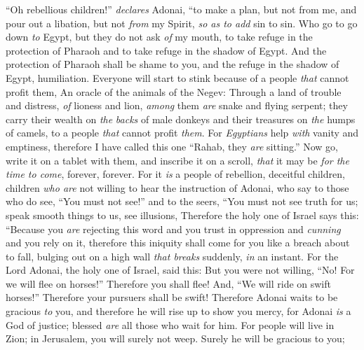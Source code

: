 \begin{biblechapter} %
 “Oh rebellious children!” \textit{declares} Adonai,
\verse “to make a plan, but not from me, 
and pour out a libation, but not \textit{from} my Spirit, 
\textit{so as to add} sin to sin.
\verse Who go to go down \textit{to} Egypt, 
but they do not ask \textit{of} my mouth, 
to take refuge in the protection of Pharaoh 
and to take refuge in the shadow of Egypt.
\verse And the protection of Pharaoh shall be shame to you, 
and the refuge in the shadow of Egypt, humiliation.
\verse Everyone will start to stink because of a people \textit{that} cannot profit them,
 An oracle of the animals of the Negev:
\verse Through a land of trouble and distress, 
\textit{of} lioness and lion, 
\textit{among} them \textit{are} snake and flying serpent; 
they carry their wealth on \textit{the} \textit{backs} of male donkeys 
and their treasures on \textit{the} humps of camels, 
to a people \textit{that} cannot profit \textit{them}.
\verse For \textit{Egyptians} help \textit{with} vanity and emptiness, 
therefore I have called this one “Rahab, they \textit{are} sitting.”
\verse Now go, write it on a tablet with them, 
and inscribe it on a scroll, 
\textit{that} it may be \textit{for the time to come}, 
forever, forever.
\verse For it \textit{is} a people of rebellion, deceitful children, 
children \textit{who are} not willing to hear the instruction of Adonai,
\verse who say to those who do see, “You must not see!” 
and to the seers, “You must not see truth for us; 
speak smooth things to us, 
see illusions,
\verse Therefore the holy one of Israel says this:
\verse “Because you \textit{are} rejecting this word 
and you trust in oppression and \textit{cunning} 
and you rely on it,
\verse therefore this iniquity shall come for you like a breach about to fall, 
bulging out on a high wall \textit{that breaks} suddenly, \textit{in} an instant.
\verse For the Lord Adonai, the holy one of Israel, said this:
\verse But you were not willing,
\verse “No! For we will flee on horses!” Therefore you shall flee! 
And, “We will ride on swift horses!” Therefore your pursuers shall be swift!
 Therefore Adonai waits to be gracious \textit{to} you, 
and therefore he will rise up to show you mercy, 
for Adonai \textit{is} a God of justice; 
blessed \textit{are} all those who wait for him.
\verse For people will live in Zion; 
in Jerusalem, you will surely not weep. 
Surely he will be gracious to you; 

\end{biblechapter}
